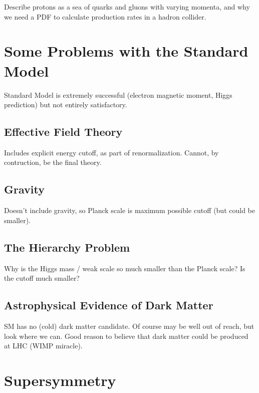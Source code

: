   Describe protons as a sea of quarks and gluons with varying momenta, and why we need a PDF to calculate production rates in a hadron collider.

\section{Some Problems with the Standard Model} \label{sec:SMproblems}

Standard Model is extremely successful (electron magnetic moment, Higgs prediction) but not entirely satisfactory.

  \subsection{Effective Field Theory} \label{sec:effective}

  Includes explicit energy cutoff, as part of renormalization.
  Cannot, by contruction, be the final theory.

  \subsection{Gravity} \label{sec:gravity}

  Doesn't include gravity, so Planck scale is maximum possible cutoff (but could be smaller).

  \subsection{The Hierarchy Problem} \label{sec:hierarchy}

  Why is the Higgs mass / weak scale so much smaller than the Planck scale?
  Is the cutoff much smaller?

  \subsection{Astrophysical Evidence of Dark Matter} \label{sec:DMevidence}

  SM has no (cold) dark matter candidate.
  Of course may be well out of reach, but look where we can.
  Good reason to believe that dark matter could be produced at LHC (WIMP miracle).


\section{Supersymmetry} \label{sec:SUSY}

